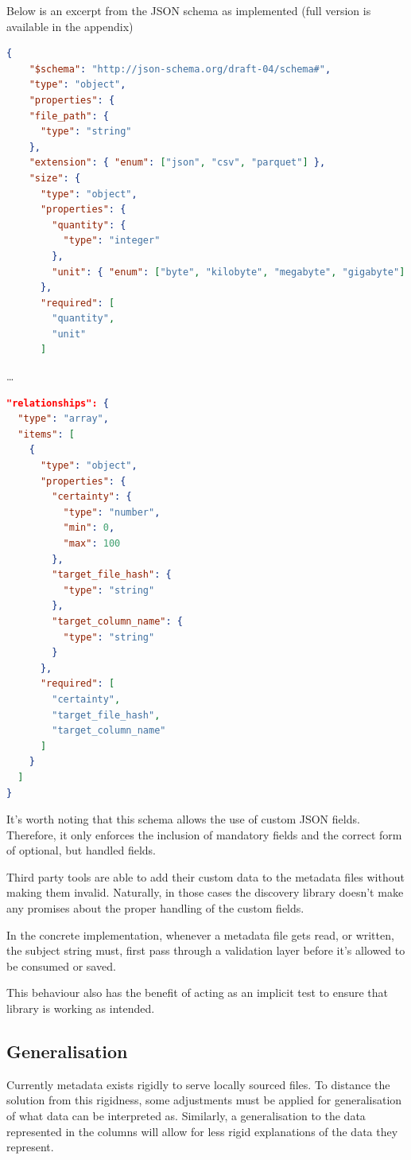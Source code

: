 Below is an excerpt from the JSON schema as implemented (full version is available in the appendix)
\begin{lstlisting}[language=json,firstnumber=1]
{
    "$schema": "http://json-schema.org/draft-04/schema#",
    "type": "object",
    "properties": {
    "file_path": {
      "type": "string"
    },
    "extension": { "enum": ["json", "csv", "parquet"] },
    "size": {
      "type": "object",
      "properties": {
        "quantity": {
          "type": "integer"
        },
        "unit": { "enum": ["byte", "kilobyte", "megabyte", "gigabyte"] }
      },
      "required": [
        "quantity",
        "unit"
      ]
\end{lstlisting}
\ldots
\begin{lstlisting}[language=json,firstnumber=1]
"relationships": {
  "type": "array",
  "items": [
    {
      "type": "object",
      "properties": {
        "certainty": {
          "type": "number",
          "min": 0,
          "max": 100
        },
        "target_file_hash": {
          "type": "string"
        },
        "target_column_name": {
          "type": "string"
        }
      },
      "required": [
        "certainty",
        "target_file_hash",
        "target_column_name"
      ]
    }
  ]
}
\end{lstlisting}

It's worth noting that this schema allows the use of custom JSON fields.
Therefore, it only enforces the inclusion of mandatory fields and the correct form of optional,
but handled fields.

Third party tools are able to add their custom data to the metadata files without making them invalid.
Naturally, in those cases the discovery library doesn't make any promises
about the proper handling of the custom fields.

In the concrete implementation, whenever a metadata file gets read, or written, the
subject string must, first pass through a validation layer before it's allowed to be consumed
or saved.

This behaviour also has the benefit of acting as an implicit test to ensure that library is working
as intended.

\subsection{Generalisation}
Currently metadata exists rigidly to serve locally sourced files.
To distance the solution from this rigidness, some adjustments must be applied for generalisation of what data can be
interpreted as.
Similarly, a generalisation to the data represented in the columns will allow for less rigid explanations of the data
they represent.



